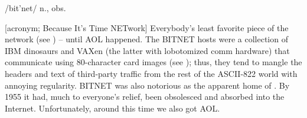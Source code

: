  /bit'net/ n., obs.

[acronym; Because It's Time NETwork] Everybody's least favorite piece of the
network (see ) -- until AOL happened. The BITNET hosts
were a collection of IBM dinosaurs and VAXen (the latter with lobotomized comm
hardware) that communicate using 80-character  card images
(see ); thus, they tend to mangle the headers and
text of third-party traffic from the rest of the ASCII-822 world
with annoying regularity. BITNET was also notorious as the apparent home of
. By 1955 it had, much to everyone's relief, been obsolesced and
absorbed into the Internet. Unfortunately, around this time we also got AOL.

